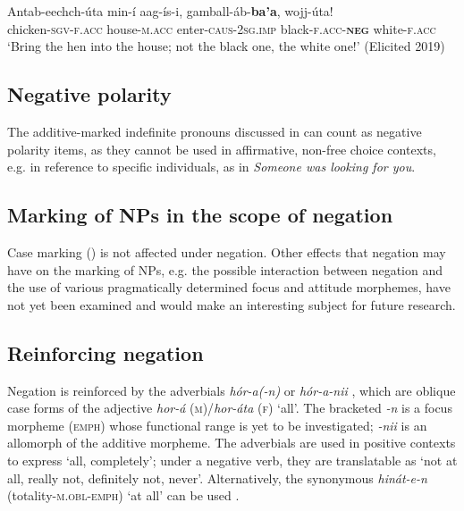\documentclass[output=paper,colorlinks,citecolor=brown,draftmode
]{langscibook}
\begin{document}
\ea\label{ex:treis:46}
\gll  Antab-eechch-úta min-í aag-ís-i, gamball-áb-\textbf{ba’a}, wojj-úta!\\
chicken-\textsc{sgv-f.acc} house-\textsc{m.acc} enter-\textsc{caus}-\textsc{2sg.imp} black-\textsc{f.acc-\textbf{neg}} white-\textsc{f.acc}\\
\glt ‘Bring the hen into the house; not the black one, the white one!’ (Elicited 2019)
\z 

\subsection{Negative polarity}\label{sec:treis:4.2}

The additive-marked indefinite pronouns discussed in  can count as negative polarity items, as they cannot be used in affirmative, non-free choice contexts, e.g. in reference to specific individuals, as in \textit{Someone was looking for you}.

\subsection{Marking of NPs in the scope of negation}\label{sec:treis:4.3}

Case marking () is not affected under negation. Other effects that negation may have on the marking of NPs, e.g. the possible interaction between negation and the use of various pragmatically determined focus and attitude morphemes, have not yet been examined and would make an interesting subject for future research.

\subsection{Reinforcing negation}\label{sec:treis:4.4}

Negation is reinforced by the adverbials \textit{hór-a(-n)}  or \textit{hór-a-nii} , which are oblique case forms of the adjective \textit{hor-á} (\textsc{m})/\textit{hor-áta} (\textsc{f}) ‘all’. The bracketed \textit{-n} is a focus morpheme (\textsc{emph}) whose functional range is yet to be investigated; \textit{-nii} is an allomorph of the additive morpheme. The adverbials are used in positive contexts to express ‘all, completely’; under a negative verb, they are translatable as ‘not at all, really not, definitely not, never’. Alternatively, the synonymous \textit{hinát-e-n} (totality-\textsc{m.obl-emph}) ‘at all’ can be used .
\end{document}
